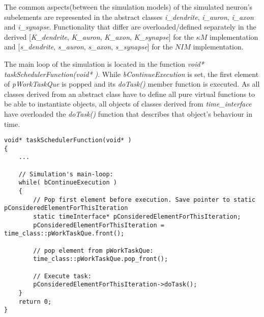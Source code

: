			The common aspects(between the simulation models) of the simulated neuron's subelements are represented in the abstract classes \emph{i\_dendrite}, \emph{i\_auron}, \emph{i\_axon} and \emph{i\_synapse}.
			Functionality that differ are overloaded/defined separately in the derived [\emph{K\_dendrite}, \emph{K\_auron}, \emph{K\_axon}, \emph{K\_synapse}] for the $\kappa M$ implementation and 
				[\emph{s\_dendrite}, \emph{s\_auron}, \emph{s\_axon}, \emph{s\_synapse}] for the $NIM$ implementation.

			The main loop of the simulation is located in the function \emph{void* taskSchedulerFunction(void* )}.
			While \emph{bContinueExecution} is set, the first element of \emph{pWorkTaskQue} is popped and its \emph{doTask()} member function is executed.
			As all classes derived from an abstract class have to define all pure virtual functions to be able to instantiate objects,
				all objects of classes derived from \emph{time\_interface} have overloaded the \emph{doTask()} function that describes that object's behaviour in time.

\begin{lstlisting}
void* taskSchedulerFunction(void* )
{
	...
	
    // Simulation's main-loop:
    while( bContinueExecution )
    {
        // Pop first element before execution. Save pointer to static pConsideredElementForThisIteration
        static timeInterface* pConsideredElementForThisIteration;
        pConsideredElementForThisIteration = time_class::pWorkTaskQue.front();

        // pop element from pWorkTaskQue:
        time_class::pWorkTaskQue.pop_front();

        // Execute task:
        pConsideredElementForThisIteration->doTask();
    }
    return 0;
}
\end{lstlisting}
			
